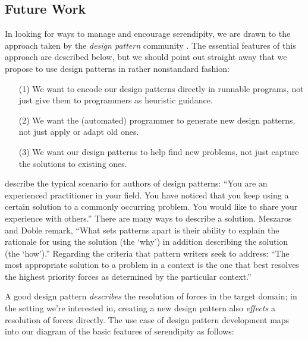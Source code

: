 \subsection{Future Work} \label{sec:futurework} \label{sec:hatching}

In looking for ways to manage and encourage serendipity, we are drawn to the approach taken by the \emph{design
  pattern} community \cite{alexander1999origins}.  The essential
features of this approach are described below, but we should point out
straight away that we propose to use design patterns in rather
nonstandard fashion:
\begin{itemize}
\item[(1)] We want to encode our design patterns directly in runnable
  programs, not just give them to programmers as heuristic guidance.
\item[(2)] We want the (automated) programmer to generate new design
  patterns, not just apply or adapt old ones.
\item[(3)] We want our design patterns to help find new problems,
  not just capture the solutions to existing ones.
\end{itemize}

 describe the typical scenario for authors of design
patterns: ``You are an experienced practitioner in your
field. You have noticed that you keep using a certain solution to a
commonly occurring problem. You would like to share your experience
with others.''  There are many ways to describe a solution.
Meszaros and Doble remark, ``What sets patterns apart is their
ability to explain the rationale for using the solution (the `why') in
addition describing the solution (the `how').''  Regarding the
criteria that pattern writers seek to address: ``The most appropriate
solution to a problem in a context is the one that best resolves the
highest priority forces as determined by the particular context.'' 


A good design pattern \emph{describes} the resolution of forces in the
target domain; in the setting we're interested in, creating a new
design pattern also \emph{effects} a resolution of forces directly.
The use case of design pattern development maps into our diagram of
the basic features of serendipity as follows:



